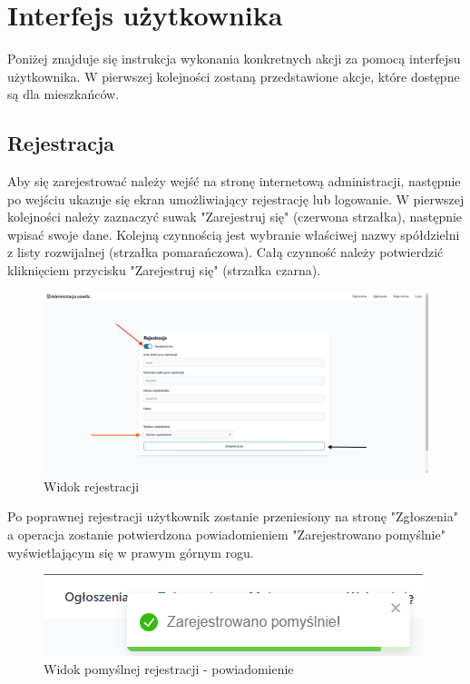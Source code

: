 \newpage
\section{Interfejs użytkownika}
Poniżej znajduje się instrukcja wykonania konkretnych akcji za pomocą interfejsu użytkownika. W pierwszej kolejności zostaną przedstawione akcje, które dostępne są dla mieszkańców.
\subsection{Rejestracja}
Aby się zarejestrować należy wejść na stronę internetową administracji, następnie po wejściu ukazuje się ekran umożliwiający rejestrację lub logowanie. W pierwszej kolejności należy zaznaczyć suwak "Zarejestruj się" (czerwona strzałka), następnie wpisać swoje dane. Kolejną czynnością jest wybranie właściwej nazwy spółdzielni z listy rozwijalnej (strzałka pomarańczowa). Całą czynność należy potwierdzić kliknięciem przycisku "Zarejestruj się" (strzałka czarna).
\begin{figure}[H]
    \centering
    \includegraphics[width=1\linewidth]{img/rejestracja_instrukcja.png}
    \caption{Widok rejestracji}
    \label{fig:register-instr}
\end{figure}
Po poprawnej rejestracji użytkownik zostanie przeniesiony na stronę "Zgłoszenia" a operacja zostanie potwierdzona powiadomieniem "Zarejestrowano pomyślnie" wyświetlającym się w prawym górnym rogu.
\begin{figure}[H]
    \centering
    \includegraphics[width=0.75\linewidth]{img/register-succ-toast.png}
    \caption{Widok pomyślnej rejestracji - powiadomienie}
    \label{fig:enter-label}
\end{figure}
